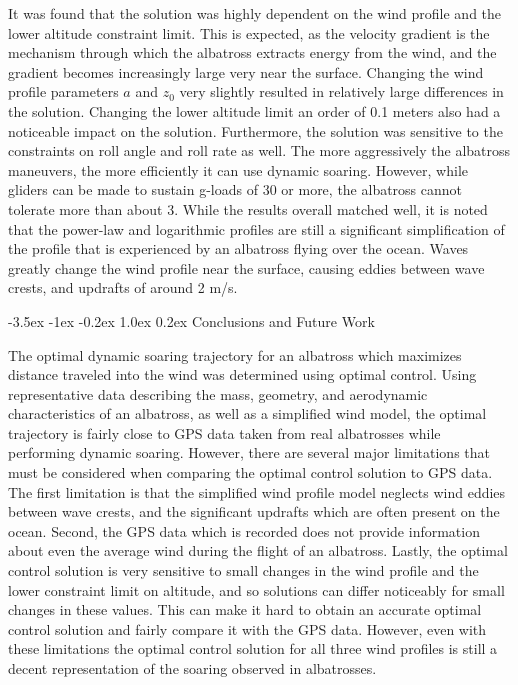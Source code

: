 \documentclass[11pt,letterpaper,onecolumn]{article}
\makeatletter
\renewcommand\section{\@startsection{section}{1}{\z@}%
 {-3.5ex \@plus-1ex \@minus-0.2ex}%
 {1.0ex \@plus0.2ex}%
 {\fontsize{12pt}{12pt}\selectfont\bfseries\sffamily}}
\makeatother
\begin{document}
It was found that the solution was highly dependent on the wind profile and the lower altitude constraint limit.
This is expected, as the velocity gradient is the mechanism through which the albatross extracts energy from the wind, and the gradient becomes increasingly large very near the surface.
Changing the wind profile parameters $a$ and $z_{0}$ very slightly resulted in relatively large differences in the solution.
Changing the lower altitude limit an order of 0.1 meters also had a noticeable impact on the solution.
Furthermore, the solution was sensitive to the constraints on roll angle and roll rate as well.
The more aggressively the albatross maneuvers, the more efficiently it can use dynamic soaring.
However, while gliders can be made to sustain g-loads of 30 or more, the albatross cannot tolerate more than about 3.
While the results overall matched well, it is noted that the power-law and logarithmic profiles are still a significant simplification of the profile that is experienced by an albatross flying over the ocean.
Waves greatly change the wind profile near the surface, causing eddies between wave crests, and updrafts of around 2 m/s.

\section{Conclusions and Future Work}

The optimal dynamic soaring trajectory for an albatross which maximizes distance traveled into the wind was determined using optimal control.
Using representative data describing the mass, geometry, and aerodynamic characteristics of an albatross, as well as a simplified wind model, the optimal trajectory is fairly close to GPS data taken from real albatrosses while performing dynamic soaring.
However, there are several major limitations that must be considered when comparing the optimal control solution to GPS data.
The first limitation is that the simplified wind profile model neglects wind eddies between wave crests, and the significant updrafts which are often present on the ocean.
Second, the GPS data which is recorded does not provide information about even the average wind during the flight of an albatross.
Lastly, the optimal control solution is very sensitive to small changes in the wind profile and the lower constraint limit on altitude, and so solutions can differ noticeably for small changes in these values.
This can make it hard to obtain an accurate optimal control solution and fairly compare it with the GPS data.
However, even with these limitations the optimal control solution for all three wind profiles is still a decent representation of the soaring observed in albatrosses.
\end{document}
